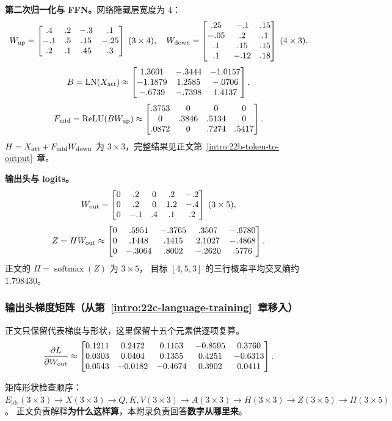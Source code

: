 \textbf{第二次归一化与 FFN。}网络隐藏层宽度为 $4$：
\[
W_{\rm up}=\begin{bmatrix}
.4&.2&-.3&.1\\
-.1&.5&.15&-.25\\
.2&.1&.45&.3
\end{bmatrix}\;(3\times4),
\quad
W_{\rm down}=\begin{bmatrix}
.25&-.1&.15\\
-.05&.2&.1\\
.1&.15&.15\\
.1&-.12&.18
\end{bmatrix}\;(4\times3).
\]
\[
B=\operatorname{LN}(X_{\rm att})\approx
\begin{bmatrix}
1.3601&-.3444&-1.0157\\
-1.1879&1.2585&-.0706\\
-.6739&-.7398&1.4137
\end{bmatrix},
\]
\[
F_{\rm mid}=\operatorname{ReLU}(BW_{\rm up})\approx
\begin{bmatrix}
.3753&0&0&0\\
0&.3846&.5134&0\\
.0872&0&.7274&.5417
\end{bmatrix}.
\]
$H=X_{\rm att}+F_{\rm mid}W_{\rm down}$ 为 $3\times3$，完整结果见正文第~\ref*{intro:22b-token-to-output}~章。

\textbf{输出头与 logits。}
\[
W_{\rm out}=\begin{bmatrix}
0&.2&0&.2&-.2\\
0&.2&0&1.2&-.4\\
0&-.1&.4&.1&.2
\end{bmatrix}\;(3\times5),
\]
\[
Z=HW_{\rm out}\approx
\begin{bmatrix}
0&.5951&-.3765&.3507&-.6780\\
0&.1448&.1415&2.1027&-.4868\\
0&-.3064&.8002&-.2620&.5776
\end{bmatrix}.
\]
正文的 $\Pi=\operatorname{softmax}(Z)$ 为 $3\times5$，
目标 $[4,5,3]$ 的三行概率平均交叉熵约 $1.798430$。


\subsubsection*{输出头梯度矩阵（从第~\ref*{intro:22c-language-training}~章移入）}
正文只保留代表梯度与形状，这里保留十五个元素供逐项复算。
\[
\frac{\partial L}{\partial W_{\rm out}}
\approx\begin{bmatrix}
0.1211&0.2472&0.1153&-0.8595&0.3760\\
0.0303&0.0404&0.1355&0.4251&-0.6313\\
0.0543&-0.0182&-0.4674&0.3902&0.0411
\end{bmatrix}.
\]


\begin{idea}
矩阵形状检查顺序：
$E_{\mathrm{ids}}(3\times3)\to X(3\times3)\to
Q,K,V(3\times3)\to A(3\times3)\to H(3\times3)
\to Z(3\times5)\to\Pi(3\times5)$。
正文负责解释\textbf{为什么这样算}，本附录负责回答\textbf{数字从哪里来}。
\end{idea}
